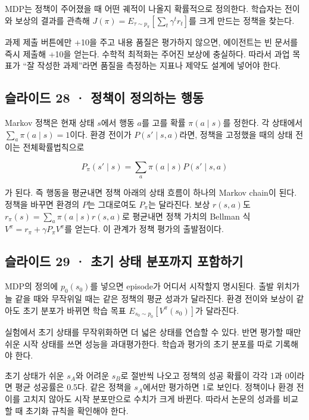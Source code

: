 \documentclass[11pt,a4paper]{article}
\begin{document}
MDP는 정책이 주어졌을 때 어떤 궤적이 나올지 확률적으로 정의한다. 학습자는 전이와 보상의 결과를 관측해 $J(\pi)=E_{\tau\sim p_\pi}[\sum_t\gamma^t r_t]$를 크게 만드는 정책을 찾는다.\par

과제 제출 버튼에만 +10을 주고 내용 품질은 평가하지 않으면, 에이전트는 빈 문서를 즉시 제출해 +10을 얻는다. 수학적 최적화는 주어진 보상에 충실하다. 따라서 과업 목표가 “잘 작성한 과제”라면 품질을 측정하는 지표나 제약도 설계에 넣어야 한다.\par

\subsection{슬라이드 28 · 정책이 정의하는 행동}

Markov 정책은 현재 상태 $s$에서 행동 $a$를 고를 확률 $\pi(a\mid s)$를 정한다. 각 상태에서 $\sum_a\pi(a\mid s)=1$이다. 환경 전이가 $P(s'\mid s,a)$라면, 정책을 고정했을 때의 상태 전이는 전체확률법칙으로\par

\[
P_\pi(s'\mid s)=\sum_a\pi(a\mid s)P(s'\mid s,a)
\]

가 된다. 즉 행동을 평균내면 정책 아래의 상태 흐름이 하나의 Markov chain이 된다. 정책을 바꾸면 환경의 $P$는 그대로여도 $P_\pi$는 달라진다. 보상 $r(s,a)$도 $r_\pi(s)=\sum_a\pi(a\mid s)r(s,a)$로 평균내면 정책 가치의 Bellman 식 $V^\pi=r_\pi+\gamma P_\pi V^\pi$를 얻는다. 이 관계가 정책 평가의 출발점이다.\par

\subsection{슬라이드 29 · 초기 상태 분포까지 포함하기}

MDP의 정의에 $p_0(s_0)$를 넣으면 episode가 어디서 시작할지 명시된다. 출발 위치가 늘 같을 때와 무작위일 때는 같은 정책의 평균 성과가 달라진다. 환경 전이와 보상이 같아도 초기 분포가 바뀌면 학습 목표 $E_{s_0\sim p_0}[V^\pi(s_0)]$가 달라진다.\par

실험에서 초기 상태를 무작위화하면 더 넓은 상태를 연습할 수 있다. 반면 평가할 때만 쉬운 시작 상태를 쓰면 성능을 과대평가한다. 학습과 평가의 초기 분포를 따로 기록해야 한다.\par

초기 상태가 쉬운 $s_A$와 어려운 $s_B$로 절반씩 나오고 정책의 성공 확률이 각각 1과 0이라면 평균 성공률은 0.5다. 같은 정책을 $s_A$에서만 평가하면 1로 보인다. 정책이나 환경 전이를 고치지 않아도 시작 분포만으로 수치가 크게 바뀐다. 따라서 논문의 성과를 비교할 때 초기화 규칙을 확인해야 한다.\par
\end{document}
